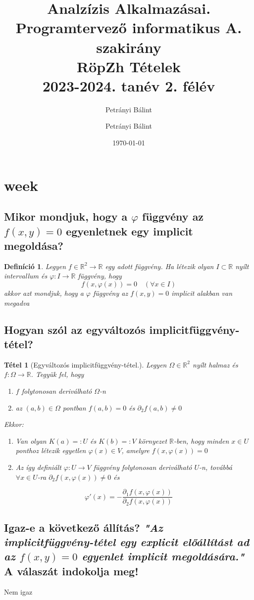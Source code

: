 \documentclass[12pt,a4paper]{article}
\author{Petrányi Bálint}\usepackage[pdfusetitle]{hyperref}
\date{\today}
\author{Petrányi Bálint}
\title{%
	\textbf{Analzízis Alkalmazásai.} \\
	\textbf{Programtervező informatikus A. szakirány} \\
	RöpZh Tételek\\
	\large 2023-2024. tanév 2. félév
}
\newcommand{\R}{\mathbb{R}}
\newcommand{\f}{\varphi}
\newtheorem{tet}{Tétel}[section]
\newtheorem{defi}{Definíció}[section]
\begin{document}
\maketitle
\tableofcontents
\newpage
\section{week}
\subsection{Mikor mondjuk, hogy a $\f$ függvény az $f(x, y) = 0$ egyenletnek egy implicit megoldása?}
\begin{defi}
Legyen $f \in \R^2 \rightarrow \R$ egy adott függvény. Ha létezik olyan $I \subset \R$ nyílt intervallum és $\f : I \rightarrow \R$ függvény, hogy 
\[
f(x,\f(x)) = 0 \quad (\forall x \in I)
\]
akkor azt mondjuk, hogy a $\f$ függvény az $f(x, y) = 0$ implicit alakban van megadva
\end{defi}
\subsection{Hogyan szól az egyváltozós implicitfüggvény-tétel?}
\begin{tet}[Egyváltozós implicitfüggvény-tétel.]
Legyen $\Omega \in \R^2$ nyílt halmaz és $f : \Omega \rightarrow \R$. Tegyük fel, hogy
\begin{enumerate}
\item[(a)] $f$  folytonosan deriválható $\Omega$-n
\item[(b)] az $(a,b) \in \Omega$ pontban $f(a,b) = 0 $ és $\partial_2 f(a,b) \neq 0$
\end{enumerate}
Ekkor:
\begin{enumerate}
\item Van olyan $K(a) =: U$ és $K(b) =: V$ környezet $\R$-ben, hogy minden $x \in U$ ponthoz létezik egyetlen $\f(x) \in V$, amelyre $f(x, \f(x)) = 0$
\item Az így definiált $\f : U \rightarrow V$ függvény folytonosan deriválható $U$-n, továbbá $\forall x \in U$-ra  $\partial_2 f(x,\f(x)) \neq 0$ és
\end{enumerate}
\[
\f'(x) = - \frac{\partial_1 f (x,\f(x))}{\partial_2 f(x,\f(x))}
\]
\end{tet}
\subsection{Igaz-e a következő állítás? \textit{"Az implicitfüggvény-tétel egy explicit előállítást ad az $f(x, y) = 0$ egyenlet implicit megoldására."} A válaszát indokolja meg!}
Nem igaz
\end{document}
